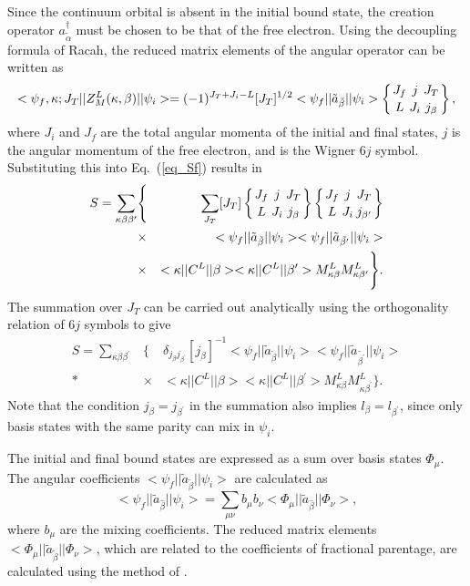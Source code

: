 Since the continuum orbital is absent in the initial bound state, the creation
operator $a^{\dagger}_{\tilde{\alpha}}$ must be chosen to be that of the free
electron. Using the decoupling formula of Racah, the reduced matrix elements
of the angular operator can be written as
\begin{equation}
<\psi_f,\kappa;J_T||Z^L_M(\kappa,\beta)||\psi_i>=(-1)^{J_T+J_i-L}[J_T]^{1/2}
<\psi_f||\tilde{a}_{\tilde{\beta}}||\psi_i>\sixj{J_f}{j}{J_T}{L}{J_i}{j_\beta},
\end{equation}
where $J_i$ and $J_f$ are the total angular momenta of the initial and final
states, $j$ is the angular momentum of the free electron, and
 is the Wigner $6j$ symbol. Substituting
this into Eq.~(\ref{eq_Sf}) results in
\begin{eqnarray}
S=\sum_{\kappa\beta\beta^\prime}&\Bigg\{&\sum_{J_T}[J_T]
\sixj{J_f}{j}{J_T}{L}{J_i}{j_\beta}
\sixj{J_f}{j}{J_T}{L}{J_i}{j_{\beta^\prime}} 
\nonumber\\*
&\times&
<\psi_f||\tilde{a}_{\tilde{\beta}}||\psi_i>
<\psi_f||\tilde{a}_{\tilde{\beta^\prime}}||\psi_i> 
\nonumber\\*
&\times& 
<\kappa||C^L||\beta><\kappa||C^L||\beta^\prime>
M^L_{\kappa\beta}M^L_{\kappa\beta^\prime}\Bigg\}.
\end{eqnarray}
The summation over $J_T$ can be carried out analytically using the
orthogonality relation of $6j$ symbols to give
\begin{eqnarray}
S=\sum_{\kappa\beta\beta^\prime}&\Bigg\{&\delta_{j_\beta
j_{\beta^\prime}}[j_\beta]^{-1} <\psi_f||\tilde{a}_{\tilde{\beta}}||\psi_i>
<\psi_f||\tilde{a}_{\tilde{\beta^\prime}}||\psi_i>
\nonumber\\*
&\times&
<\kappa||C^L||\beta><\kappa||C^L||\beta^\prime>
M^L_{\kappa\beta}M^L_{\kappa\beta^\prime}\Bigg\}.
\end{eqnarray}
Note that the condition $j_\beta = j_{\beta^\prime}$ in the summation also
implies $l_\beta = l_{\beta^\prime}$, since only basis states with the same
parity can mix in $\psi_i$. 

The initial and final bound states are expressed as a sum over basis states
$\Phi_\mu$. The angular coefficients
$<\psi_f||\tilde{a}_{\tilde{\beta}}||\psi_i>$ are calculated as
\begin{equation}
<\psi_f||\tilde{a}_{\hat{\beta}}||\psi_i> = \sum_{\mu\nu}b_\mu b_\nu
<\Phi_\mu||\tilde{a}_{\hat{\beta}}||\Phi_\nu>,
\end{equation}
where $b_\mu$ are the mixing coefficients. The reduced matrix elements
$<\Phi_\mu||\tilde{a}_{\tilde{\beta}}||\Phi_\nu>$, which are related to the
coefficients of fractional parentage, are calculated using the method of
\citet{gaigalas:1997a}. 

